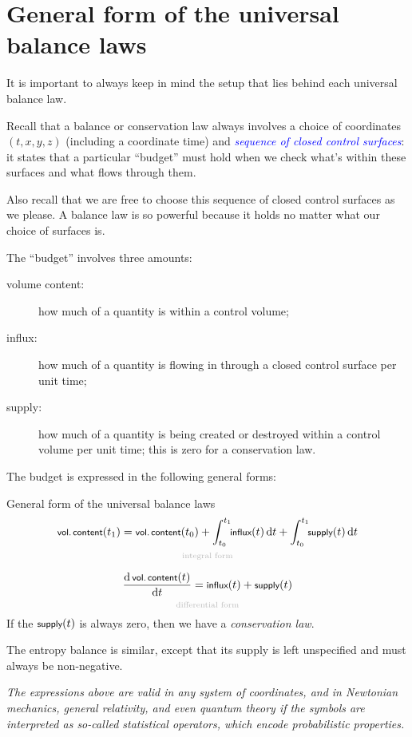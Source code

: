 \documentclass[a4paper,12pt,%
onecolumn,oneside,titlepage,%
british%
]{memoir}
\newcommand*{\di}{\mathrm{d}}%
\renewcommand*{\|}[1][]{\nonscript\:#1\vert\nonscript\:\mathopen{}}
\newcommand*{\sect}{\S}%
\renewcommand*{\autoref}[2]{\sidepar{\vspace{-1ex}\footnotesize{\color{blue}\faIcon{%
angle-right%
}\enspace\sect\,\ref{#1} page\,\pageref{#1}}}\textcolor{blue}{#2}}
\newcommand*{\yti}{t_{0}}
\newcommand*{\ytf}{t_{1}}
\begin{document}
\section{General form of the universal balance laws}
\label{sec:common_formulation}

It is important to always keep in mind the setup that lies behind each universal balance law.

Recall that a balance or conservation law always involves a choice of coordinates $(t,x,y,z)$ (including a coordinate time) and \autoref{sec:conservation_laws}{\emph{sequence of closed control surfaces}}: it states that a particular \enquote{budget} must hold when we check what's within these surfaces and what flows through them.

Also recall that we are free to choose this sequence of closed control surfaces as we please. A balance law is so powerful because it holds no matter what our choice of surfaces is.

The \enquote{budget} involves three amounts:
\begin{description}
\item[volume content:] how much of a quantity is within a control volume;
\item[influx:] how much of a quantity is flowing in through a closed control surface per unit time;
\item[supply:] how much of a quantity is being created or destroyed within a control volume per unit time; this is zero for a conservation law.
\end{description}

The budget is expressed in the following general forms:
\begin{definition}{General form of the universal balance laws}
  \begin{equation*}
    \begin{gathered}[t]
      \underbracket[0pt]{\textsf{\footnotesize vol.\,content}(\ytf) = \textsf{\footnotesize vol.\,content}(\yti) + \int_{\yti}^{\ytf}\!\!\textsf{\footnotesize influx}(t)\,\di t + \int_{\yti}^{\ytf}\!\!\textsf{\footnotesize supply}(t)\,\di t}_{\mathclap{\text{\color{grey}integral form}}}
      \\[2\jot]
      \underbracket[0pt]{\frac{\di\,\textsf{\footnotesize vol.\,content}(t)}{\di t} = \textsf{\footnotesize influx}(t) + \textsf{\footnotesize supply}(t)}_{\mathclap{\text{\color{grey}differential form}}}
    \end{gathered}
  \end{equation*}
  If the $\textsf{\footnotesize supply}(t)$ is always zero, then we have a \emph{conservation law}.

  \smallskip

    The entropy balance is similar, except that its supply is left unspecified and must always be non-negative.

      \smallskip

  \emph{The expressions above are valid in any system of coordinates, and in Newtonian mechanics, general relativity, and even quantum theory if the symbols are interpreted as so-called statistical operators, which encode probabilistic properties.}
\end{definition}
\end{document}
